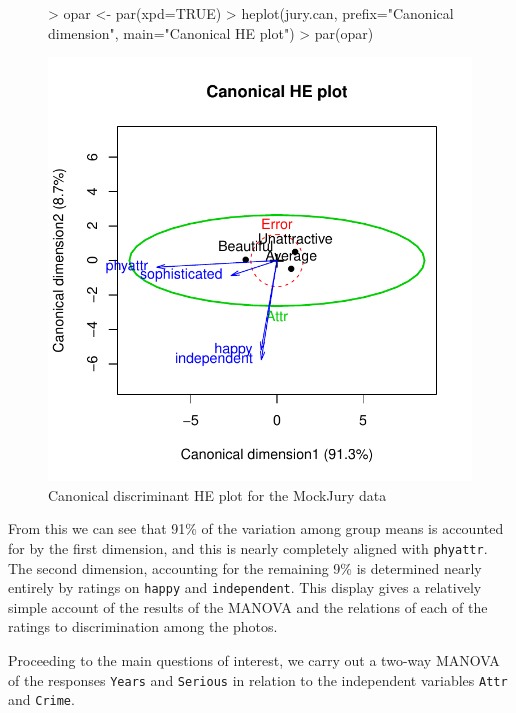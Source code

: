 \documentclass[11pt]{article}
\newcommand{\code}[1]{{\texttt{#1}}}
\begin{document}
\begin{figure}[htb]
\begin{center}
\begin{Schunk}
\begin{Sinput}
> opar <- par(xpd=TRUE)
> heplot(jury.can, prefix="Canonical dimension", main="Canonical HE plot")
> par(opar)
\end{Sinput}
\end{Schunk}
\includegraphics{fig/plot-jury-can1}
\caption{Canonical discriminant HE plot for the MockJury data}
\label{fig:jury-can1}
\end{center}
\end{figure}

From this we can see that 91\% of the variation among group means
is accounted for by the first dimension, and this is nearly completely
aligned with \code{phyattr}. 
The second dimension, accounting for the remaining 9\%
is determined nearly entirely by ratings on \code{happy} and \code{independent}.
This display gives a relatively simple account of the results of the MANOVA
and the relations of each of the ratings to discrimination among the photos.

Proceeding to the main questions of interest, we carry out a two-way MANOVA of the responses
\code{Years} and \code{Serious} in relation to the independent variables
\code{Attr} and \code{Crime}.
\end{document}

